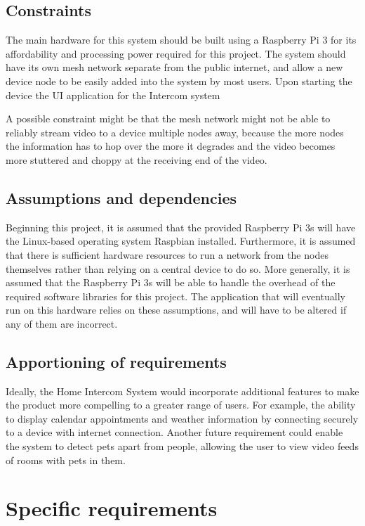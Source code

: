\documentclass[onecolumn, draftclsnofoot,10pt, compsoc]{IEEEtran}
\begin{document}
\subsection{Constraints}
The main hardware for this system should be built using a Raspberry Pi 3 for its affordability and processing power required for this project. The system should have its own mesh network separate from the public internet, and allow a new device node to be easily added into the system by most users. Upon starting the device the UI application for the Intercom system 

\noindent A possible constraint might be that the mesh network might not be able to reliably stream video to a device multiple nodes away, because the more nodes the information has to hop over the more it degrades and the video becomes more stuttered and choppy at the receiving end of the video.

\subsection{Assumptions and dependencies}
Beginning this project, it is assumed that the provided Raspberry Pi 3s will have the Linux-based operating system Raspbian installed. Furthermore, it is assumed that there is sufficient hardware resources to run a network from the nodes themselves rather than relying on a central device to do so. More generally, it is assumed that the Raspberry Pi 3s will be able to handle the overhead of the required software libraries for this project. The application that will eventually run on this hardware relies on these assumptions, and will have to be altered if any of them are incorrect. 

\subsection{Apportioning of requirements}
Ideally, the Home Intercom System would incorporate additional features to make the product more compelling to a greater range of users. For example, the ability to display calendar appointments and weather information by connecting securely to a device with internet connection. Another future requirement could enable the system to detect pets apart from people, allowing the user to view video feeds of rooms with pets in them. 

\section{Specific requirements}
\end{document}
